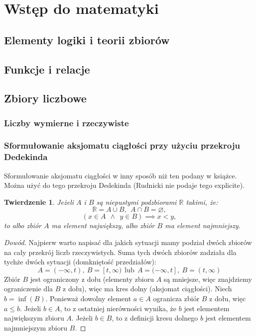 \documentclass{article}
\newtheorem*{theorem}{Twierdzenie}
\begin{document}
\section{Wstęp do matematyki}
\subsection{Elementy logiki i teorii zbiorów}

\subsection{Funkcje i relacje}

\subsection{Zbiory liczbowe}
\subsubsection{Liczby wymierne i rzeczywiste}
\subsubsection{Sformułowanie aksjomatu ciągłości przy użyciu przekroju Dedekinda}
Sformułowanie aksjomatu ciągłości w inny sposób niż ten podany w książce. Można użyć do tego
przekroju Dedekinda (Rudnicki nie podaje tego explicite).

\begin{theorem}
    Jeżeli \(A\) i \(B\) są niepustymi podzbiorami \(\mathbb{R}\) takimi, że:
    \begin{equation}
        \mathbb{R} = A \cup B, \ \ A \cap B = \varnothing,
    \end{equation}
    \begin{equation}
        (x \in A \ \ \land \ \ y \in B) \implies x < y,
    \end{equation}
    to albo zbiór \(A\) ma element największy, albo zbiór \(B\) ma element najmniejszy.
\end{theorem}
\begin{proof}[Dowód]
    Najpierw warto napisać dla jakich sytuacji mamy podział dwóch zbiorów na cały przekrój liczb rzeczywistych.
    Suma tych dwóch zbiorów zadziała dla tychże dwóch sytuacji (domkniętość przedziałów):
    \begin{equation*}
        A=(-\infty, t), \ B=[t,\infty) \ \ \mbox{lub} \ \ A=(-\infty, t], \ B=(t,\infty)
    \end{equation*}
    Zbiór \(B\) jest ograniczony z dołu (elementy zbioru \(A\) są mniejsze, więc znajdziemy ograniczenie dla \(B\) z dołu), 
    więc ma kres dolny (aksjomat ciągłości). Niech \(b = \inf(B)\).
    Ponieważ dowolny element \(a \in A\) ogranicza zbiór \(B\) z dołu, więc \(a \leq b\). Jeżeli \(b \in A\), to z ostatniej
    nierówności wynika, że \(b\) jest elementem największym zbioru \(A\). Jeżeli \(b \in B\), to z definicji kresu dolnego
    \(b\) jest elementem najmniejszym zbioru \(B\). 
\end{proof}
\end{document}
